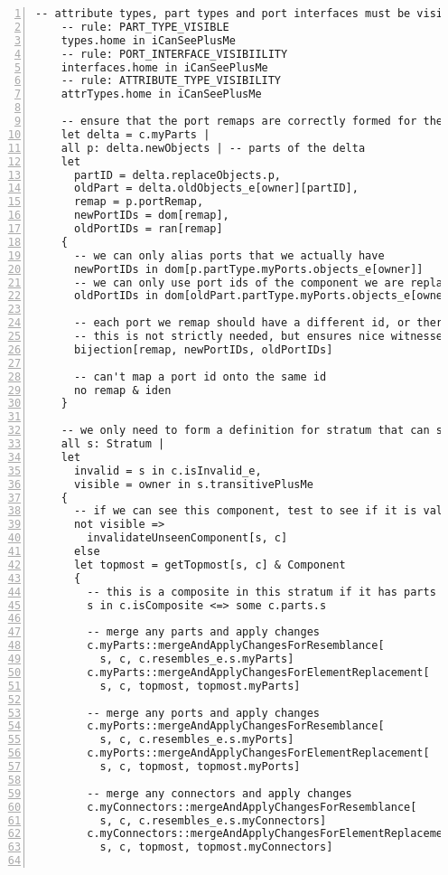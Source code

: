 \begin{lstlisting}[caption={bb.als}, numbers=left]
    -- attribute types, part types and port interfaces must be visible
    -- rule: PART_TYPE_VISIBLE
    types.home in iCanSeePlusMe
    -- rule: PORT_INTERFACE_VISIBIILITY
    interfaces.home in iCanSeePlusMe
    -- rule: ATTRIBUTE_TYPE_VISIBILITY
    attrTypes.home in iCanSeePlusMe
    
    -- ensure that the port remaps are correctly formed for the stratum they are owned by
    let delta = c.myParts |
    all p: delta.newObjects | -- parts of the delta
    let
      partID = delta.replaceObjects.p,
      oldPart = delta.oldObjects_e[owner][partID],
      remap = p.portRemap,
      newPortIDs = dom[remap],
      oldPortIDs = ran[remap]
    {
      -- we can only alias ports that we actually have
      newPortIDs in dom[p.partType.myPorts.objects_e[owner]]
      -- we can only use port ids of the component we are replacing
      oldPortIDs in dom[oldPart.partType.myPorts.objects_e[owner]]
      
      -- each port we remap should have a different id, or there's no point
      -- this is not strictly needed, but ensures nice witnesses
      bijection[remap, newPortIDs, oldPortIDs]
      
      -- can't map a port id onto the same id
      no remap & iden
    }
    
    -- we only need to form a definition for stratum that can see us
    all s: Stratum |
    let
      invalid = s in c.isInvalid_e,
      visible = owner in s.transitivePlusMe
    {
      -- if we can see this component, test to see if it is valid in this stratum
      not visible =>
        invalidateUnseenComponent[s, c]
      else
      let topmost = getTopmost[s, c] & Component
      {
        -- this is a composite in this stratum if it has parts
        s in c.isComposite <=> some c.parts.s
      
        -- merge any parts and apply changes
        c.myParts::mergeAndApplyChangesForResemblance[
          s, c, c.resembles_e.s.myParts]
        c.myParts::mergeAndApplyChangesForElementReplacement[
          s, c, topmost, topmost.myParts]
          
        -- merge any ports and apply changes
        c.myPorts::mergeAndApplyChangesForResemblance[
          s, c, c.resembles_e.s.myPorts]
        c.myPorts::mergeAndApplyChangesForElementReplacement[
          s, c, topmost, topmost.myPorts]
          
        -- merge any connectors and apply changes
        c.myConnectors::mergeAndApplyChangesForResemblance[
          s, c, c.resembles_e.s.myConnectors]
        c.myConnectors::mergeAndApplyChangesForElementReplacement[
          s, c, topmost, topmost.myConnectors]
          

\end{lstlisting}
